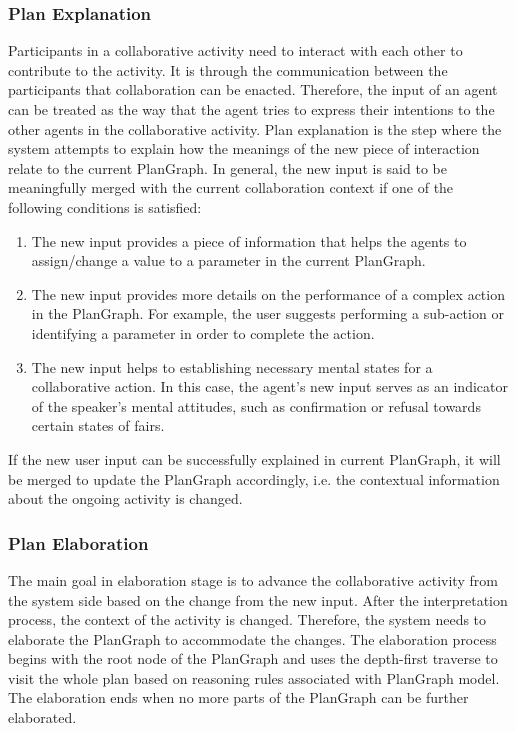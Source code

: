 \subsubsection*{Plan Explanation}
Participants in a collaborative activity need to interact with each other to contribute to the activity. It is through the communication between the participants that collaboration can be enacted. Therefore, the input of an agent can be treated as the way that the agent tries to express their intentions to the other agents in the collaborative activity. Plan explanation is the step where the system attempts to explain how the meanings of the new piece of interaction relate to the current PlanGraph. In general, the new input is said to be meaningfully merged with the current collaboration context if one of the following conditions is satisfied:

\begin{enumerate}
\item The new input provides a piece of information that helps the agents to assign/change a value to a parameter in the current PlanGraph. 
\item The new input provides more details on the performance of a complex action in the PlanGraph. For example, the user suggests performing a sub-action or identifying a parameter in order to complete the action.
\item The new input helps to establishing necessary mental states for a collaborative action. In this case, the agent's new input serves as an indicator of the speaker's mental attitudes, such as confirmation or refusal towards certain states of fairs. 
\end{enumerate}

If the new user input can be successfully explained in current PlanGraph, it will be merged to update the PlanGraph accordingly, i.e. the contextual information about the ongoing activity is changed.

\subsubsection*{Plan Elaboration}
The main goal in elaboration stage is to advance the collaborative activity from the system side based on the change from the new input. After the interpretation process, the context of the activity is changed. Therefore, the system needs to elaborate the PlanGraph to accommodate the changes. The elaboration process begins with the root node of the PlanGraph and uses the depth-first traverse to visit the whole plan based on reasoning rules associated with PlanGraph model. The elaboration ends when no more parts of the PlanGraph can be further elaborated.

